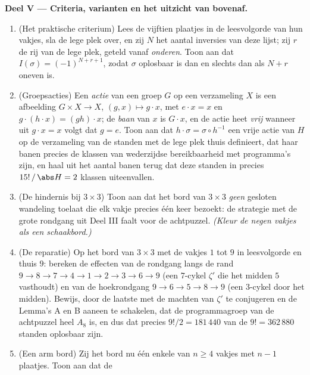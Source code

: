 \begin{problem}
\medskip
\noindent\textbf{Deel V --- Criteria, varianten en het uitzicht
van bovenaf.}
\begin{enumerate}[resume]
  \item (Het praktische criterium) Lees de vijftien plaatjes in de
        leesvolgorde van hun vakjes, sla de lege plek over, en zij
        $N$ het aantal inversies van deze lijst; zij $r$ de rij
        van de lege plek, geteld vanaf \emph{onderen}. Toon aan
        dat $I(\sigma) = (-1)^{N + r + 1}$, zodat $\sigma$
        oplosbaar is dan en slechts dan als $N + r$ oneven is.
  \item (Groepsacties) Een \emph{actie} van een groep $G$ op een
        verzameling $X$ is een afbeelding $G \times X \to X$, $(g,
        x) \mapsto g \cdot x$, met $e \cdot x = x$ en $g \cdot (h
        \cdot x) = (gh) \cdot x$; de \emph{baan} van $x$ is $G
        \cdot x$, en de actie heet \emph{vrij} wanneer uit $g
        \cdot x = x$ volgt dat $g = e$. Toon aan dat $h \cdot
        \sigma = \sigma \circ h^{-1}$ een vrije actie van $H$ op
        de verzameling van de standen met de lege plek thuis
        definieert, dat haar banen precies de klassen van
        wederzijdse bereikbaarheid met programma's zijn, en haal
        uit het aantal banen terug dat deze standen in precies
        $15!\,/\,\abs H = 2$ klassen uiteenvallen.
  \item (De hindernis bij $3 \times 3$) Toon aan dat het bord van
        $3 \times 3$ \emph{geen} gesloten wandeling toelaat die
        elk vakje precies één keer bezoekt: de strategie met de
        grote rondgang uit Deel III faalt voor de achtpuzzel.
        \emph{(Kleur de negen vakjes als een schaakbord.)}
  \item (De reparatie) Op het bord van $3 \times 3$ met de vakjes
        $1$ tot $9$ in leesvolgorde en thuis $9$: bereken de
        effecten van de rondgang langs de rand $9 \to 8 \to 7 \to
        4 \to 1 \to 2 \to 3 \to 6 \to 9$ (een $7$-cykel $\zeta'$
        die het midden $5$ vasthoudt) en van de hoekrondgang $9
        \to 6 \to 5 \to 8 \to 9$ (een $3$-cykel door het midden).
        Bewijs, door de laatste met de machten van $\zeta'$ te
        conjugeren en de Lemma's A en B aaneen te schakelen, dat
        de programmagroep van de achtpuzzel heel $A_8$ is, en dus
        dat precies $9!/2 = 181\,440$ van de $9! = 362\,880$
        standen oplosbaar zijn.
  \item (Een arm bord) Zij het bord nu één enkele  van $n
        \geq 4$ vakjes met $n - 1$ plaatjes. Toon aan dat de

\end{enumerate}
\end{problem}
